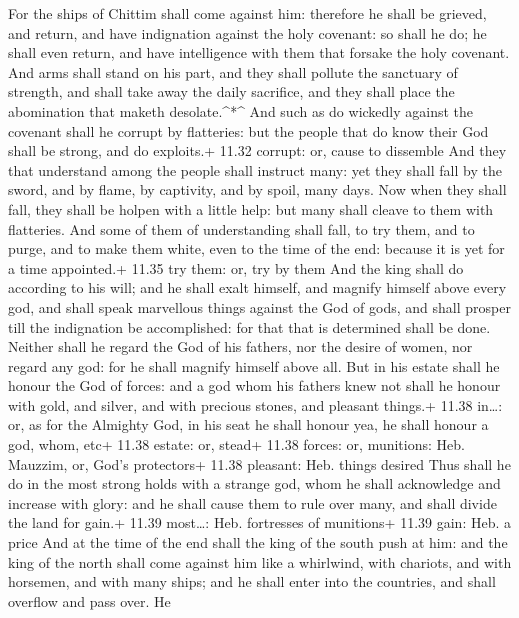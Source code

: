  For the ships of Chittim shall come against him: therefore
he shall be grieved, and return, and have indignation against the holy
covenant: so shall he do; he shall even return, and have intelligence
with them that forsake the holy covenant.  And arms shall
stand on his part, and they shall pollute the sanctuary of strength, and
shall take away the daily sacrifice, and they shall place the
abomination that maketh desolate.\^{}*\^{}  And such as do
wickedly against the covenant shall he corrupt by flatteries: but the
people that do know their God shall be strong, and do exploits.+ 11.32
corrupt: or, cause to dissemble  And they that understand
among the people shall instruct many: yet they shall fall by the sword,
and by flame, by captivity, and by spoil, many days.  Now
when they shall fall, they shall be holpen with a little help: but many
shall cleave to them with flatteries.  And some of them of
understanding shall fall, to try them, and to purge, and to make them
white, even to the time of the end: because it is yet for a time
appointed.+ 11.35 try them: or, try by them  And the king
shall do according to his will; and he shall exalt himself, and magnify
himself above every god, and shall speak marvellous things against the
God of gods, and shall prosper till the indignation be accomplished: for
that that is determined shall be done.  Neither shall he
regard the God of his fathers, nor the desire of women, nor regard any
god: for he shall magnify himself above all.  But in his
estate shall he honour the God of forces: and a god whom his fathers
knew not shall he honour with gold, and silver, and with precious
stones, and pleasant things.+ 11.38 in\ldots: or, as for the Almighty
God, in his seat he shall honour yea, he shall honour a god, whom, etc+
11.38 estate: or, stead+ 11.38 forces: or, munitions: Heb. Mauzzim, or,
God's protectors+ 11.38 pleasant: Heb. things desired  Thus
shall he do in the most strong holds with a strange god, whom he shall
acknowledge and increase with glory: and he shall cause them to rule
over many, and shall divide the land for gain.+ 11.39 most\ldots: Heb.
fortresses of munitions+ 11.39 gain: Heb. a price  And at
the time of the end shall the king of the south push at him: and the
king of the north shall come against him like a whirlwind, with
chariots, and with horsemen, and with many ships; and he shall enter
into the countries, and shall overflow and pass over.  He

